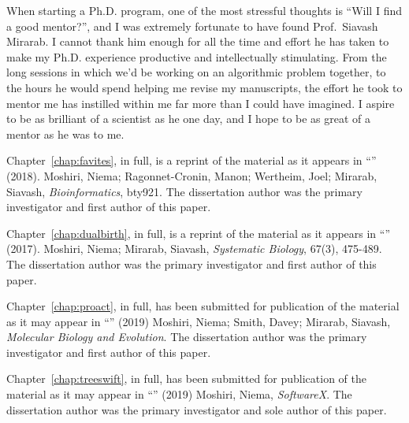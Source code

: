 \begin{frontmatter}
\begin{acknowledgements}
When starting a Ph.D. program, one of the most stressful thoughts is ``Will I find a good mentor?'', and I was extremely fortunate to have found Prof.~Siavash Mirarab. I cannot thank him enough for all the time and effort he has taken to make my Ph.D. experience productive and intellectually stimulating. From the long sessions in which we'd be working on an algorithmic problem together, to the hours he would spend helping me revise my manuscripts, the effort he took to mentor me has instilled within me far more than I could have imagined. I aspire to be as brilliant of a scientist as he one day, and I hope to be as great of a mentor as he was to me.

Chapter~\ref{chap:favites}, in full, is a reprint of the material as it appears in ``\favitestitle'' (2018). Moshiri, Niema; Ragonnet-Cronin, Manon; Wertheim, Joel; Mirarab, Siavash, \textit{Bioinformatics}, bty921. The dissertation author was the primary investigator and first author of this paper.

Chapter~\ref{chap:dualbirth}, in full, is a reprint of the material as it appears in ``\dualbirthtitle'' (2017). Moshiri, Niema; Mirarab, Siavash, \textit{Systematic Biology}, 67(3), 475-489. The dissertation author was the primary investigator and first author of this paper.

Chapter~\ref{chap:proact}, in full, has been submitted for publication of the material as it may appear in ``\proacttitle'' (2019) Moshiri, Niema; Smith, Davey; Mirarab, Siavash, \textit{Molecular Biology and Evolution}. The dissertation author was the primary investigator and first author of this paper.

Chapter~\ref{chap:treeswift}, in full, has been submitted for publication of the material as it may appear in ``\treeswifttitle'' (2019) Moshiri, Niema, \textit{SoftwareX}. The dissertation author was the primary investigator and sole author of this paper. 
\end{acknowledgements}


\end{frontmatter}
